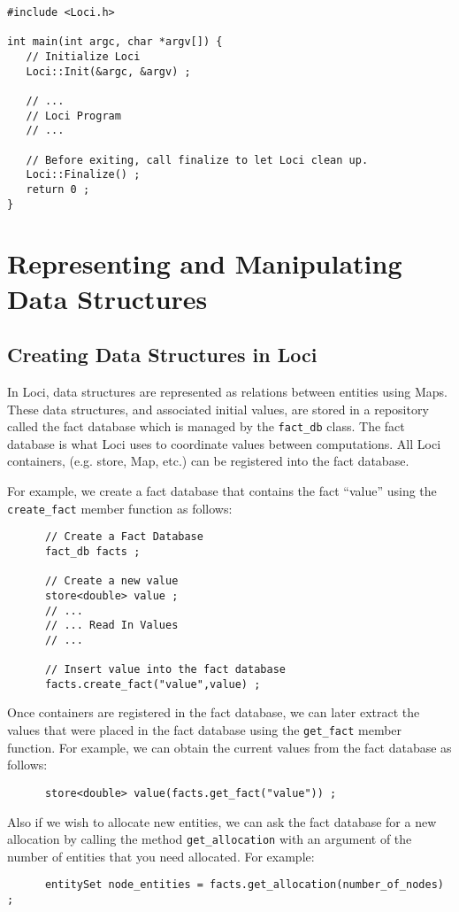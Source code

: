 \documentclass[10pt,epsf]{book}
\begin{document}
\begin{verbatim}
#include <Loci.h>

int main(int argc, char *argv[]) {
   // Initialize Loci
   Loci::Init(&argc, &argv) ;

   // ...
   // Loci Program
   // ...

   // Before exiting, call finalize to let Loci clean up.
   Loci::Finalize() ;
   return 0 ;
}
\end{verbatim}

\chapter{Representing and Manipulating Data Structures}
\section{Creating Data Structures in Loci}

In Loci, data structures are represented as relations between entities
using Maps.  These data structures, and associated initial values, are
stored in a repository called the fact database which is managed by
the {\tt fact\_db} class.  The fact database is what Loci uses to
coordinate values between computations.  All Loci containers, (e.g.
store, Map, etc.) can be registered into the fact database.

For example, we create a fact database that contains the fact ``value'' using the {\tt create\_fact} member function as follows:
\begin{verbatim}
      // Create a Fact Database
      fact_db facts ;

      // Create a new value
      store<double> value ;
      // ...
      // ... Read In Values
      // ...
   
      // Insert value into the fact database
      facts.create_fact("value",value) ;
\end{verbatim}

Once containers are registered in the fact database, we can later
extract the values that were placed in the fact database using the 
{\tt get\_fact} member function.  For example, we can obtain the
current values from the fact database as follows:
\begin{verbatim}
      store<double> value(facts.get_fact("value")) ;
\end{verbatim}

Also if we wish to allocate new entities, we can ask the fact database
for a new allocation by calling the method {\tt get\_allocation} with
an argument of the number of entities that you need allocated.  For
example:
\begin{verbatim}
      entitySet node_entities = facts.get_allocation(number_of_nodes) ;
\end{verbatim}
\end{document}
